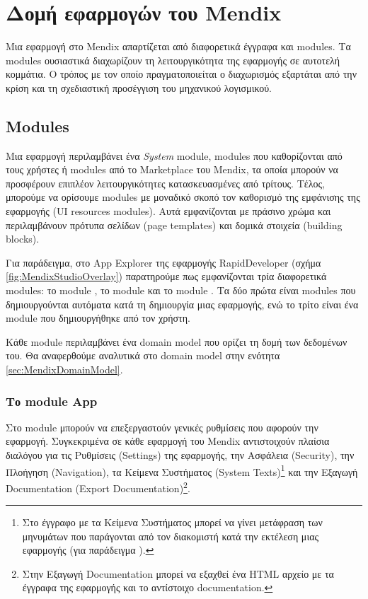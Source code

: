     \section{Δομή εφαρμογών του Mendix}
        Μια εφαρμογή στο Mendix απαρτίζεται από διαφορετικά έγγραφα και modules. Τα modules ουσιαστικά διαχωρίζουν τη λειτουργικότητα της εφαρμογής σε αυτοτελή κομμάτια. Ο τρόπος με τον οποίο πραγματοποιείται ο διαχωρισμός εξαρτάται από την κρίση και τη σχεδιαστική προσέγγιση του μηχανικού λογισμικού.

        \subsection{Modules}
            Μια εφαρμογή περιλαμβάνει ένα \textit{System} module, modules που καθορίζονται από τους χρήστες ή modules από το Marketplace του Mendix, τα οποία μπορούν να προσφέρουν επιπλέον λειτουργικότητες κατασκευασμένες από τρίτους. Τέλος, μπορούμε να ορίσουμε modules με μοναδικό σκοπό τον καθορισμό της εμφάνισης της εφαρμογής (UI resources modules). Αυτά εμφανίζονται με πράσινο χρώμα και περιλαμβάνουν πρότυπα σελίδων (page templates) και δομικά στοιχεία (building blocks).

            Για παράδειγμα, στο App Explorer της εφαρμογής RapidDeveloper (σχήμα \ref{fig:MendixStudioOverlay}) παρατηρούμε πως εμφανίζονται τρία διαφορετικά modules: το module , το module  και το module . Τα δύο πρώτα είναι modules που δημιουργούνται αυτόματα κατά τη δημιουργία μιας εφαρμογής, ενώ το τρίτο είναι ένα module που δημιουργήθηκε από τον χρήστη.

            Κάθε module περιλαμβάνει ένα domain model που ορίζει τη δομή των δεδομένων του. Θα αναφερθούμε αναλυτικά στο domain model στην ενότητα \ref{sec:MendixDomainModel}.

            \subsubsection{Το module App}
            Στο module  μπορούν να επεξεργαστούν γενικές ρυθμίσεις που αφορούν την εφαρμογή. Συγκεκριμένα σε κάθε εφαρμογή του Mendix αντιστοιχούν πλαίσια διαλόγου για τις Ρυθμίσεις (Settings) της εφαρμογής, την Ασφάλεια (Security), την Πλοήγηση (Navigation), τα Κείμενα Συστήματος (System Texts)\footnote{Στο έγγραφο με τα Κείμενα Συστήματος μπορεί να γίνει μετάφραση των μηνυμάτων που παράγονται από τον διακομιστή κατά την εκτέλεση μιας εφαρμογής (για παράδειγμα ).} και την Εξαγωγή Documentation (Export Documentation)\footnote{Στην Εξαγωγή Documentation μπορεί να εξαχθεί ένα HTML αρχείο με τα έγγραφα της εφαρμογής και το αντίστοιχο documentation.}.

